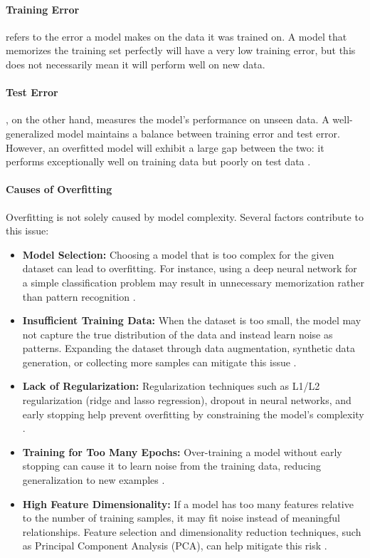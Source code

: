 \paragraph{Training Error}  refers to the error a model makes on the data it was trained on. A model that memorizes the training set perfectly will have a very low training error, but this does not necessarily mean it will perform well on new data.

\paragraph{Test Error} , on the other hand, measures the model's performance on unseen data. A well-generalized model maintains a balance between training error and test error. However, an overfitted model will exhibit a large gap between the two: it performs exceptionally well on training data but poorly on test data \cite{geman1992neural, bishop2006pattern}.

\paragraph{Causes of Overfitting} 
Overfitting is not solely caused by model complexity. Several factors contribute to this issue:

\begin{itemize}
    \item \textbf{Model Selection:} Choosing a model that is too complex for the given dataset can lead to overfitting. For instance, using a deep neural network for a simple classification problem may result in unnecessary memorization rather than pattern recognition \cite{domingos2012few}.
    \item \textbf{Insufficient Training Data:} When the dataset is too small, the model may not capture the true distribution of the data and instead learn noise as patterns. Expanding the dataset through data augmentation, synthetic data generation, or collecting more samples can mitigate this issue \cite{shorten2019survey}.
    \item \textbf{Lack of Regularization:} Regularization techniques such as L1/L2 regularization (ridge and lasso regression), dropout in neural networks, and early stopping help prevent overfitting by constraining the model’s complexity \cite{srivastava2014dropout}.
    \item \textbf{Training for Too Many Epochs:} Over-training a model without early stopping can cause it to learn noise from the training data, reducing generalization to new examples \cite{prechelt1998early}.
    \item \textbf{High Feature Dimensionality:} If a model has too many features relative to the number of training samples, it may fit noise instead of meaningful relationships. Feature selection and dimensionality reduction techniques, such as Principal Component Analysis (PCA), can help mitigate this risk \cite{jolliffe2002principal}.
\end{itemize}

